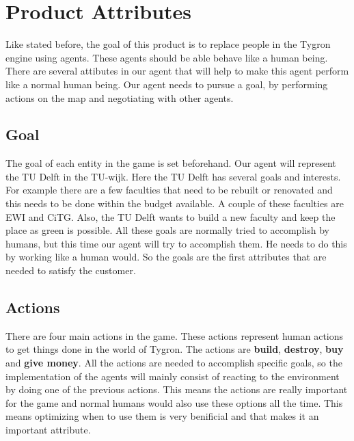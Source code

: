 \section{Product Attributes}
Like stated before, the goal of this product is to replace people in the Tygron engine using agents. These agents should be able behave like a human being. There are several attibutes in our agent that will help to make this agent perform like a normal human being. Our agent needs to pursue a goal, by performing actions on the map and negotiating with other agents.

\subsection{Goal}
The goal of each entity in the game is set beforehand. Our agent will represent the TU Delft in the TU-wijk. Here the TU Delft has several goals and interests. For example there are a few faculties that need to be rebuilt or renovated and this needs to be done within the budget available. A couple of these faculties are EWI\cite{tunietpuz} and CiTG\cite{turen}. Also, the TU Delft wants to build a new faculty and keep the place as green is possible. All these goals are normally tried to accomplish by humans, but this time our agent will try to accomplish them. He needs to do this by working like a human would. So the goals are the first attributes that are needed to satisfy the customer.

\subsection{Actions}
There are four main actions in the game. These actions represent human actions to get things done in the world of Tygron. The actions are \textbf{build}, \textbf{destroy}, \textbf{buy} and \textbf{give money}. All the actions are needed to accomplish specific goals, so the implementation of the agents will mainly consist of reacting to the environment by doing one of the previous actions. This means the actions are really important for the game and normal humans would also use these options all the time. This means optimizing when to use them is very benificial and that makes it an important attribute.

